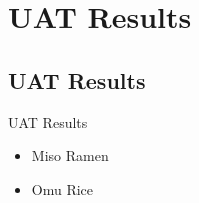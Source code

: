 \section{UAT Results}
\subsection{UAT Results}
\begin{frame}{UAT Results}
\begin{itemize}
    \item<1-> Miso Ramen
    \item<2-> Omu Rice
\end{itemize}
\end{frame}